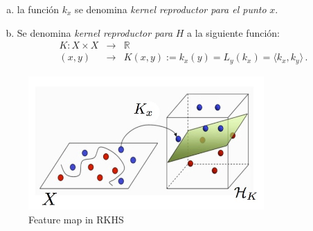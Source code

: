 \begin{enumerate}[(a)]
\begin{myremark}
\smallskip\noindent
(c)\ $f\in H$ es una funci\'on definida como:
\begin{eqnarray*}
f: X &\rightarrow &\mathbb{R} \\
 x &\rightarrow & f(x) 
\end{eqnarray*}
{\bf (c) es correcto pero no aporta nada nuevo.}

\smallskip\noindent
Las lectoras deben corregir estos p\'arrafos hasta darle un sentido
matem\'aticamente correcto, pero no deben ser inclu\'\i dos en la
versi\'on final del documento.
\end{myremark}

\item
la funci\'on $k_x$ se denomina \textit{kernel reproductor para el punto}
$x$. 

\item
Se denomina \textit{kernel reproductor para} $H$ a la siguiente funci\'on:
\begin{eqnarray*}
K: X \times X &\rightarrow &\mathbb{R} \\
(x,y) &\rightarrow & K(x,y):= k_x(y) = L_y(k_x) = \langle k_x,k_y\rangle\,.
\end{eqnarray*}
\end{enumerate}








\begin{figure}[htpb!]
\centering
\includegraphics[width=90mm]{img/featuremaphilbert.jpg}
\caption{Feature map in RKHS}
\label{overflow}
\end{figure}



